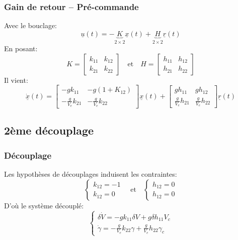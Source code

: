 \documentclass[footheight=2em]{beamer}
\begin{document}
\begin{frame}
    \frametitle{Gain de retour -- Pré-commande} \pause{}
    Avec le bouclage:
    \[
    \underline{u}(t) = -\underbrace{K}_{2 \times 2} \underline{x}(t) +
        \underbrace{H}_{2 \times 2} \underline{r}(t)
    \] \pause{}
    En posant:
    \[
    K =
    \left[
    \begin{array}{cc}
        k_{11} & k_{12} \\
        k_{21} & k_{22}
    \end{array}
    \right]\quad
    \text{et}\quad
    H =
    \left[
    \begin{array}{cc}
        h_{11} & h_{12} \\
        h_{21} & h_{22}
    \end{array}
    \right]
    \] \pause{}
    Il vient:
    \[
    \underline{\dot{x}}(t)
    =
    \left[
    \begin{array}{cc}
        -g k_{11} & -g (1+K_{12}) \\
        -\frac{g}{V_e} k_{21} & -\frac{g}{V_e} k_{22}
    \end{array}
    \right]
    \underline{x} (t)
    +
    \left[
    \begin{array}{cc}
        g h_{11} & g h_{12} \\
        \frac{g}{V_e} h_{21} & \frac{g}{V_e} h_{22}
    \end{array}
    \right]
    \underline{r} (t)
    \]
\end{frame}

\subsection{2ème découplage}

\begin{frame}
    \frametitle{Découplage} \pause{}
    Les hypothèses de découplages induisent les contraintes:
    \[
    \left \{
    \begin{array}{l}
        k_{12} = -1 \\
        k_{12} = 0
    \end{array}
    \right.\quad
    \text{et}\quad
    \left \{
    \begin{array}{l}
        h_{12} = 0 \\
        h_{12} = 0
    \end{array}
    \right.
    \]
    \pause{}
    D'où le système découplé:
    \[
    \left \{
    \begin{array}{l}
        \delta \dot{V} = -g k_{11} \delta V + g \delta h_{11} V_c \\
        \dot{\gamma} = -\frac{g}{V_e} k_{22} \gamma + \frac{g}{V_e} h_{22} \gamma_c
    \end{array}
    \right.
    \]
\end{frame}
\end{document}
